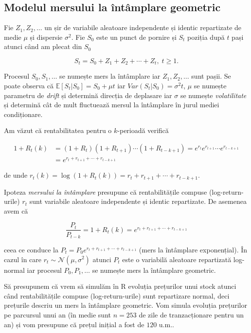 \documentclass[]{article}
\begin{document}
\subsection{Modelul mersului la întâmplare
geometric}\label{modelul-mersului-la-intamplare-geometric}

Fie \(Z_1, Z_2, \ldots\) un șir de variabile aleatoare independente și
identic repartizate de medie \(\mu\) și dispersie \(\sigma^2\). Fie
\(S_0\) este un punct de pornire și \(S_t\) poziția după \(t\) pași
atunci când am plecat din \(S_0\)

\[
  S_t = S_0 + Z_1 + Z_2 + \cdots + Z_t, \; t\geq 1.
\]

Procesul \(S_0, S_1, \ldots\) se numește mers la întâmplare iar
\(Z_1, Z_2, \ldots\) sunt pașii. Se poate observa că
\(\mathbb{E}[S_t|S_0] = S_0 + \mu t\) iar \(Var(S_t|S_0) = \sigma^2 t\),
\(\mu\) se numește parametru de \emph{drift} și determină direcția de
deplasare iar \(\sigma\) se numește \emph{volatilitate} și determină cât
de mult fluctuează mersul la întâmplare în jurul mediei condiționare.

Am văzut că rentabilitatea pentru o \(k\)-perioadă verifică

\begin{align*}
  1+R_t(k) &= \left(1+R_{t}\right)\left(1+R_{t+1}\right) \cdots \left(1+R_{t-k+1}\right) = e^{r_t}e^{r_{t+1}}\cdots e^{r_{t-k+1}}\\
           &= e^{r_t+r_{t+1}+\cdots+r_{t-k+1}}
\end{align*}

de unde \(r_t(k) = \log(1+R_t(k)) = r_t+r_{t+1}+\cdots+r_{t-k+1}\).

Ipoteza \emph{mersului la întâmplare} presupune că rentabilitățile
compuse (log-return-urile) \(r_t\) sunt variabile aleatoare independente
și identic repartizate. De asemenea avem că

\[
  \frac{P_{t}}{P_{t-k}} = 1+R_t(k) = e^{r_t+r_{t+1}+\cdots+r_{t-k+1}}
\]

ceea ce conduce la \(P_t = P_0e^{r_t+r_{t+1}+\cdots+r_{t-k+1}}\) (mers
la întâmplare exponențial). În cazul în care
\(r_t\sim\mathcal{N}(\mu, \sigma^2)\) atunci \(P_t\) este o variabilă
aleatoare repartizată log-normal iar procesul \(P_0, P_1, \ldots\) se
numește mers la întâmplare geometric.

Să presupunem că vrem să simulăm în R evoluția prețurilor unui stock
atunci când rentabilitățile compuse (log-return-urile) sunt repartizare
normal, deci prețurile descriu un mers la întâmplare geometric. Vom
simula evoluția prețurilor pe parcursul unui an (în medie sunt
\(n = 253\) de zile de tranzacționare pentru un an) și vom presupune că
prețul inițial a fost de \(120\) u.m..
\end{document}
